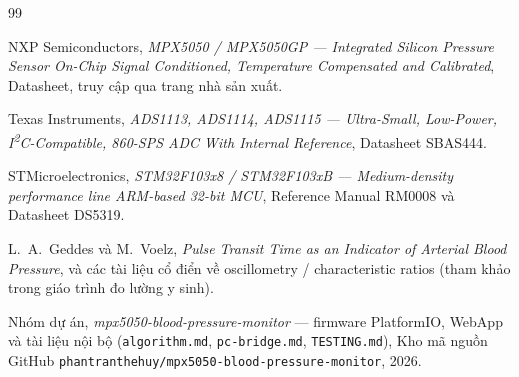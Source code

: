 \begin{thebibliography}{99}

	NXP Semiconductors,
	\textit{MPX5050 / MPX5050GP --- Integrated Silicon Pressure Sensor On-Chip Signal Conditioned, Temperature Compensated and Calibrated},
	Datasheet, truy cập qua trang nhà sản xuất.

	Texas Instruments,
	\textit{ADS1113, ADS1114, ADS1115 --- Ultra-Small, Low-Power, I\textsuperscript{2}C-Compatible, 860-SPS ADC With Internal Reference},
	Datasheet SBAS444.

	STMicroelectronics,
	\textit{STM32F103x8 / STM32F103xB --- Medium-density performance line ARM-based 32-bit MCU},
	Reference Manual RM0008 và Datasheet DS5319.

	L.\ A.\ Geddes và M.\ Voelz,
	\textit{Pulse Transit Time as an Indicator of Arterial Blood Pressure},
	và các tài liệu cổ điển về oscillometry / characteristic ratios (tham khảo trong giáo trình đo lường y sinh).

	Nhóm dự án,
	\textit{mpx5050-blood-pressure-monitor} --- firmware PlatformIO, WebApp và tài liệu nội bộ (\texttt{algorithm.md}, \texttt{pc-bridge.md}, \texttt{TESTING.md}),
	Kho mã nguồn GitHub \texttt{phantranthehuy/mpx5050-blood-pressure-monitor}, 2026.

\end{thebibliography}
